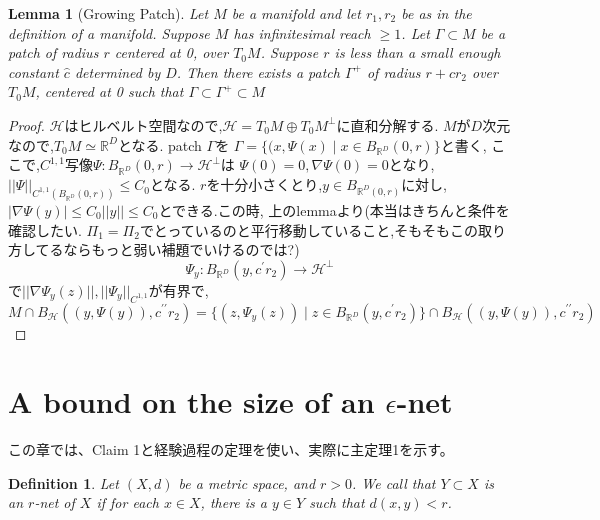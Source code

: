 \documentclass{jarticle}
\newtheorem{dfn}[thm]{Definition}
\newtheorem{lem}[thm]{Lemma}
\begin{document}
\begin{lem}[Growing Patch]
  Let $M$ be a manifold and let $r_1,r_2$ be as in the definition of a manifold.
Suppose $M$ has infinitesimal reach $ \ge 1$. Let $\Gamma \subset M$ be a patch of radius $r$ centered at 0, over $T_0M$. Suppose
$r$ is less than a small enough constant $\hat{c}$ determined by $D$. Then there exists a patch $\Gamma^{+}$ of radius $r + cr_2$
over $T_0M$, centered at 0 such that $\Gamma \subset \Gamma^{+} \subset M$
\end{lem}
\begin{proof}
 $\mathcal{H}$はヒルベルト空間なので,$\mathcal{H}=T_0M \oplus T_0M^{\perp}$に直和分解する.
 $M$が$D$次元なので,$T_0M \simeq \mathbb{R}^D$となる.
 patch $\Gamma$を
 $\Gamma =\{(x,\Psi(x) \mid x \in B_{\mathbb{R}^D}(0,r) \}$と書く,
ここで,$C^{1,1}$写像$\Psi: B_{\mathbb{R}^D}(0,r) \to \mathcal{H}^{\perp}$は
$\Psi(0)=0,\nabla\Psi(0)=0$となり,$||\Psi||_{C^{1,1}(B_{\mathbb{R}^D}(0,r))} \le C_0$となる.
$r$を十分小さくとり,$y \in B_{\mathbb{R}^D(0,r)}$に対し,
$|\nabla \Psi(y)| \le C_0||y|| \le C_0$とできる.この時,
上のlemmaより(本当はきちんと条件を確認したい.
$\Pi_1=\Pi_2$でとっているのと平行移動していること,そもそもこの取り方してるならもっと弱い補題でいけるのでは?)
\begin{equation*}
 \Psi_y:B_{\mathbb{R}^D}(y,c^{\prime} r_2) \to \mathcal{H}^{\perp}
\end{equation*}
で$||\nabla\Psi_y(z)||,||\Psi_y||_{C^{1,1}}$が有界で,
\begin{equation*}
 M \cap B_{\mathcal{H}}((y,\Psi(y)),c^{\prime\prime} r_2) =
 \{ (z,\Psi_y(z)) \mid z \in B_{\mathbb{R}^D}(y,c^{\prime} r_2)\}
 \cap B_{\mathcal{H}}((y,\Psi(y)),c^{\prime\prime} r_2)
\end{equation*}
\end{proof}


\section{A bound on the size of an $\epsilon$-net}
\label{a bound on the size of an epsilon net}
この章では、Claim 1と経験過程の定理を使い、実際に主定理1を示す。

\begin{dfn}
 Let $(X,d)$ be a metric space, and $r > 0$. We call that $Y \subset X$ is an $r$-net of $X$
 if   for each $x \in X$, there is a $y \in Y$ such that $d(x,y) < r$.
\end{dfn}
\end{document}
